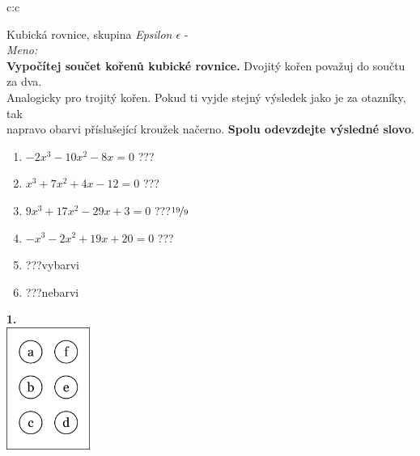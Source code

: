 \documentclass[10pt]{report}
\begin{document}
\begin{tabular}{c:c}
\begin{minipage}[c][99mm][t]{0.49\linewidth}
\begin{center}
\vspace{7mm}
{\huge Kubická rovnice, skupina \textit{Epsilon $\epsilon$} -}\\[4.5mm]
\textit{Meno:}\phantom{xxxxxxxxxxxxxxxxxxxxxxxxxxxxxxxxxxxxxxxxxxxxxxxxxxxxxxxxxxxxxxxxx}\\[3.5mm]
\textbf{Vypočítej součet kořenů kubické rovnice.} Dvojitý kořen považuj do součtu za dva.\\Analogicky pro trojitý kořen. Pokud ti vyjde stejný výsledek jako je za otazníky, tak\\napravo obarvi příslušející kroužek načerno. \textbf{Spolu odevzdejte výsledné slovo}.\\[3mm]
\begin{minipage}{0.77\linewidth}
\begin{center}
\begin{varwidth}{\textwidth}
\begin{enumerate}
\large
\item $-2x^3-10x^2-8x=0$\quad \dotfill\; ???\;\dotfill {}
\item $x^3+7x^2+4x-12=0$\quad \dotfill\; ???\;\dotfill {}
\item $9x^3+17x^2-29x+3=0$\quad \dotfill\; ???\;\dotfill \quad $\nicefrac{19}{9}$
\item $-x^3-2x^2+19x+20=0$\quad \dotfill\; ???\;\dotfill {}
\item \quad \dotfill\; ???\;\dotfill \quad vybarvi
\item \quad \dotfill\; ???\;\dotfill \quad nebarvi
\end{enumerate}
\end{varwidth}
\end{center}
\end{minipage}
\begin{minipage}{0.20\linewidth}
\begin{center}
{\Huge\bfseries 1.} \\[2mm]
\includegraphics[height=40mm]{../images/braille.png}

\end{center}
\end{minipage}
\end{center}
\end{minipage}
\end{tabular}
\end{document}
